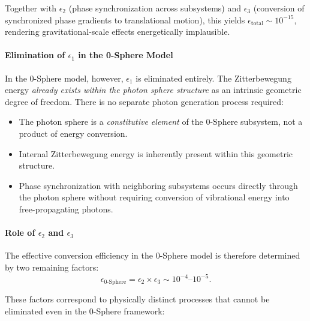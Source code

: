\documentclass[%
 reprint,
 amsmath,amssymb,
 aps,
 prb,
]{revtex4-2}
\numberwithin{equation}{section}
\begin{document}
Together with $\epsilon_2$ (phase synchronization across subsystems) and $\epsilon_3$ (conversion of synchronized phase gradients to translational motion), this yields $\epsilon_{\text{total}} \sim 10^{-15}$, rendering gravitational-scale effects energetically implausible.

\vspace{0.5cm}

\paragraph{Elimination of $\epsilon_1$ in the 0-Sphere Model}

In the 0-Sphere model, however, $\epsilon_1$ is eliminated entirely. The Zitterbewegung energy \textit{already exists within the photon sphere structure} as an intrinsic geometric degree of freedom. There is no separate photon generation process required:

\begin{itemize}
\item The photon sphere is a \textit{constitutive element} of the 0-Sphere subsystem, not a product of energy conversion.
\item Internal Zitterbewegung energy is inherently present within this geometric structure.
\item Phase synchronization with neighboring subsystems occurs directly through the photon sphere without requiring conversion of vibrational energy into free-propagating photons.
\end{itemize}

\paragraph{Role of $\epsilon_2$ and $\epsilon_3$}

The effective conversion efficiency in the 0-Sphere model is therefore determined by two remaining factors:
\begin{equation}
\epsilon_{\text{0-Sphere}} = \epsilon_2 \times \epsilon_3 \sim 10^{-4}\text{--}10^{-5}.
\end{equation}

These factors correspond to physically distinct processes that cannot be eliminated even in the 0-Sphere framework:
\end{document}
